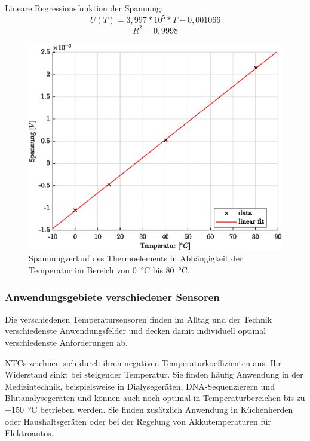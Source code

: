 Lineare Regressionsfunktion der Spannung:
\begin{equation*}
\label{eq:Spannung}
U(T)= 3,997*10^5*T-0,001066
\end{equation*}
\begin{equation*}
R^2=0,9998
\end{equation*}
\begin{figure}[H]
	\centering
	\includegraphics[height=0.2\textheight]{../MLAB/Spannung.eps}
	\caption[Spannungverlauf des Thermoelements in Abhängigkeit der Temperatur im Bereich von \SI{0}{\celsius} bis \SI{80}{\celsius} ]{Spannungverlauf des Thermoelements in Abhängigkeit der Temperatur im Bereich von \SI{0}{\celsius} bis \SI{80}{\celsius}.}
	\label{fig:Spannung}
\end{figure}

\subsubsection{Anwendungsgebiete verschiedener Sensoren}

Die verschiedenen Temperatursensoren finden im Alltag und der Technik verschiedenste Anwendungsfelder und decken damit individuell optimal verschiedenste Anforderungen ab. 

NTCs zeichnen sich durch ihren negativen Temperaturkoeffizienten aus. Ihr Widerstand sinkt bei steigender Temperatur. Sie finden häufig Anwendung in der Medizintechnik, beispielsweise in Dialysegeräten, DNA-Sequenzierern und Blutanalysegeräten und können auch noch optimal in Temperaturbereichen bis zu \SI{-150}{\celsius} betrieben werden. Sie finden zusätzlich Anwendung in Küchenherden oder Haushaltsgeräten oder bei der Regelung von Akkutemperaturen für Elektroautos. 

